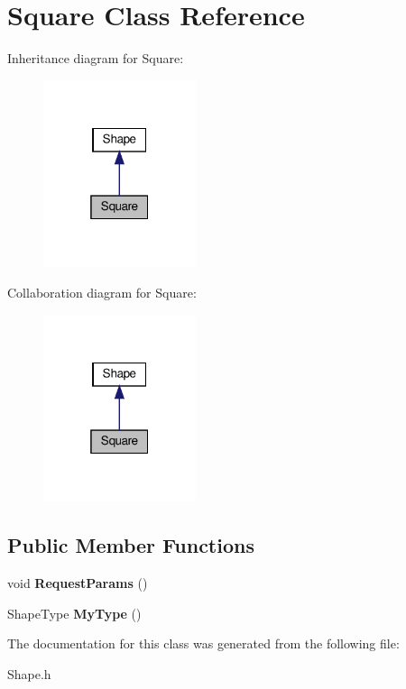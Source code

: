 \hypertarget{classSquare}{}\section{Square Class Reference}
\label{classSquare}


Inheritance diagram for Square\+:
\nopagebreak
\begin{figure}[H]
\begin{center}
\leavevmode
\includegraphics[width=127pt]{classSquare__inherit__graph}
\end{center}
\end{figure}


Collaboration diagram for Square\+:
\nopagebreak
\begin{figure}[H]
\begin{center}
\leavevmode
\includegraphics[width=127pt]{classSquare__coll__graph}
\end{center}
\end{figure}
\subsection*{Public Member Functions}
\begin{DoxyCompactItemize}
\item 
\mbox{\label{classSquare_ae1640c4edbcf409671b230a405a707e2}} 
void {\bfseries Request\+Params} ()
\item 
\mbox{\label{classSquare_a6ce99af81c134404c21e15e1cfbe5664}} 
Shape\+Type {\bfseries My\+Type} ()
\end{DoxyCompactItemize}


The documentation for this class was generated from the following file\+:\begin{DoxyCompactItemize}
\item 
Shape.\+h\end{DoxyCompactItemize}

